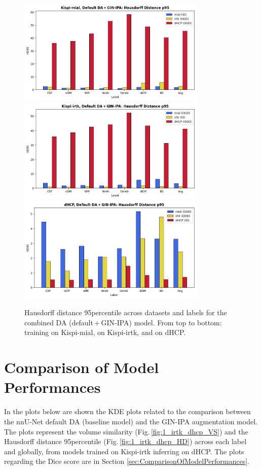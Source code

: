 \begin{figure}[htbp]
    \centering
    \includegraphics[width=0.8\textwidth]{figures/mial_both_HD.png}\\
    \vspace{2pt}
    \includegraphics[width=0.8\textwidth]{figures/irtk_both_HD.png}\\
    \vspace{2pt}
    \includegraphics[width=0.8\textwidth]{figures/dHCP_both_HD.png}
    \caption{Hausdorff distance 95\th percentile across datasets and labels for the combined DA (default\,+\,GIN-IPA) model. From top to bottom: training on Kispi-mial, on Kispi-irtk, and on dHCP.}
    \label{fig:both_HD}
\end{figure}

\section{Comparison of Model Performances}
In the plots below are shown the KDE plots related to the comparison between the nnU-Net default DA (baseline model) and the GIN-IPA augmentation model. The plots represent the volume similarity (Fig.\,\ref{fig:1_irtk_dhcp_VS}) and the Hausdorff distance 95\th percentile (Fig.\,\ref{fig:1_irtk_dhcp_HD}) across each label and globally, from models trained on Kispi-irtk inferring on dHCP. The plots regarding the Dice score are in Section \ref{sec:ComparisonOfModelPerformances}.

